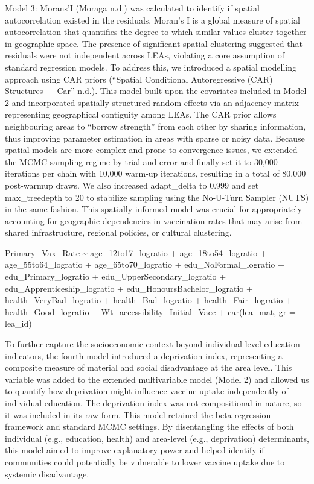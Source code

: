 \documentclass{article}
\begin{document}
Model 3: Morans'I (Moraga n.d.) was calculated to identify if spatial
autocorrelation existed in the residuals. Moran's I is a global measure
of spatial autocorrelation that quantifies the degree to which similar
values cluster together in geographic space. The presence of significant
spatial clustering suggested that residuals were not independent across
LEAs, violating a core assumption of standard regression models. To
address this, we introduced a spatial modelling approach using CAR
priors ({``Spatial Conditional Autoregressive ({CAR}) Structures ---
Car''} n.d.). This model built upon the covariates included in Model 2
and incorporated spatially structured random effects via an adjacency
matrix representing geographical contiguity among LEAs. The CAR prior
allows neighbouring areas to ``borrow strength'' from each other by
sharing information, thus improving parameter estimation in areas with
sparse or noisy data. Because spatial models are more complex and prone
to convergence issues, we extended the MCMC sampling regime by trial and
error and finally set it to 30,000 iterations per chain with 10,000
warm-up iterations, resulting in a total of 80,000 post-warmup draws. We
also increased adapt\_delta to 0.999 and set max\_treedepth to 20 to
stabilize sampling using the No-U-Turn Sampler (NUTS) in the same
fashion. This spatially informed model was crucial for appropriately
accounting for geographic dependencies in vaccination rates that may
arise from shared infrastructure, regional policies, or cultural
clustering.

Primary\_Vax\_Rate \textasciitilde{} age\_12to17\_logratio +
age\_18to54\_logratio + age\_55to64\_logratio + age\_65to70\_logratio +
edu\_NoFormal\_logratio + edu\_Primary\_logratio +
edu\_UpperSecondary\_logratio + edu\_Apprenticeship\_logratio +
edu\_HonoursBachelor\_logratio + health\_VeryBad\_logratio +
health\_Bad\_logratio + health\_Fair\_logratio + health\_Good\_logratio
+ Wt\_accessibility\_Initial\_Vacc + car(lea\_mat, gr = lea\_id)

To further capture the socioeconomic context beyond individual-level
education indicators, the fourth model introduced a deprivation index,
representing a composite measure of material and social disadvantage at
the area level. This variable was added to the extended multivariable
model (Model 2) and allowed us to quantify how deprivation might
influence vaccine uptake independently of individual education. The
deprivation index was not compositional in nature, so it was included in
its raw form. This model retained the beta regression framework and
standard MCMC settings. By disentangling the effects of both individual
(e.g., education, health) and area-level (e.g., deprivation)
determinants, this model aimed to improve explanatory power and helped
identify if communities could potentially be vulnerable to lower vaccine
uptake due to systemic disadvantage.
\end{document}
